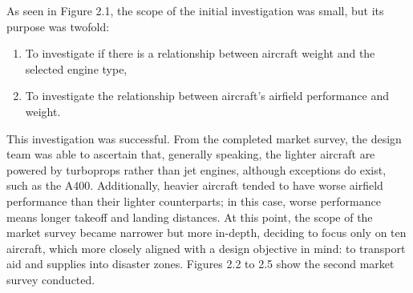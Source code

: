 \documentclass[stu, a4paper, 12pt, floatsintext]{apa7}
\numberwithin{figure}{section}
\numberwithin{table}{section}
\numberwithin{equation}{section}
\begin{document}
As seen in Figure 2.1, the scope of the initial investigation was small, but its purpose was twofold:
\begin{enumerate}
    \item To investigate if there is a relationship between aircraft weight and the selected engine type,
    \item To investigate the relationship between aircraft’s airfield performance and weight.
\end{enumerate}

This investigation was successful. From the completed market survey, the design team was able to ascertain that, generally speaking, the lighter aircraft are powered by turboprops rather than jet engines, although exceptions do exist, such as the A400. Additionally, heavier aircraft tended to have worse airfield performance than their lighter counterparts; in this case, worse performance means longer takeoff and landing distances. At this point, the scope of the market survey became narrower but more in-depth, deciding to focus only on ten aircraft, which more closely aligned with a design objective in mind: to transport aid and supplies into disaster zones. Figures 2.2 to 2.5 show the second market survey conducted. 
\end{document}
